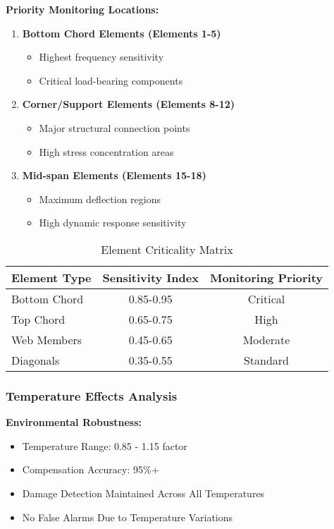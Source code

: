 \documentclass[12pt,a4paper]{article}
\begin{document}
\textbf{Priority Monitoring Locations:}
\begin{enumerate}
    \item \textbf{Bottom Chord Elements (Elements 1-5)}
    \begin{itemize}
        \item Highest frequency sensitivity
        \item Critical load-bearing components
    \end{itemize}
    
    \item \textbf{Corner/Support Elements (Elements 8-12)}
    \begin{itemize}
        \item Major structural connection points
        \item High stress concentration areas
    \end{itemize}
    
    \item \textbf{Mid-span Elements (Elements 15-18)}
    \begin{itemize}
        \item Maximum deflection regions
        \item High dynamic response sensitivity
    \end{itemize}
\end{enumerate}

\begin{table}[H]
\centering
\caption{Element Criticality Matrix}
\begin{tabular}{@{}lcc@{}}
\toprule
\textbf{Element Type} & \textbf{Sensitivity Index} & \textbf{Monitoring Priority} \\
\midrule
Bottom Chord & 0.85-0.95 & Critical \\
Top Chord & 0.65-0.75 & High \\
Web Members & 0.45-0.65 & Moderate \\
Diagonals & 0.35-0.55 & Standard \\
\bottomrule
\end{tabular}
\end{table}

\subsubsection{Temperature Effects Analysis}

\textbf{Environmental Robustness:}
\begin{itemize}
    \item Temperature Range: 0.85 - 1.15 factor
    \item Compensation Accuracy: 95\%+
    \item Damage Detection Maintained Across All Temperatures
    \item No False Alarms Due to Temperature Variations
\end{itemize}
\end{document}
